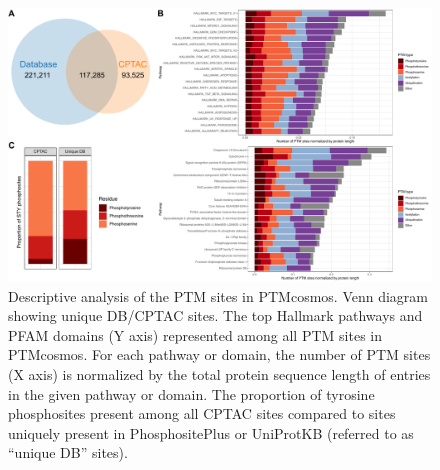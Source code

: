 \begin{figure}[tbp]
    \centering
    \includegraphics[width=\linewidth]{figures/chap03_ptmcosmos/fig2_ptmcosmos_site_detail.pdf}
    \caption[Descriptive analysis of the PTM sites in PTMcosmos.]{%
        Descriptive analysis of the PTM sites in PTMcosmos.
        Venn diagram showing unique DB/CPTAC sites.
        The top Hallmark pathways and PFAM domains (Y axis) represented among all PTM sites in PTMcosmos. For each pathway or domain, the number of PTM sites (X axis) is normalized by the total protein sequence length of entries in the given pathway or domain.
        The proportion of tyrosine phosphosites present among all CPTAC sites compared to sites uniquely present in PhosphositePlus or UniProtKB (referred to as ``unique DB'' sites).
    }
    \label{fig:ptmcosmos-site-detail}
\end{figure}

